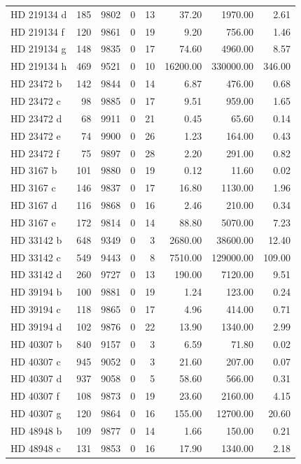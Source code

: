 \begin{table}
\begin{tabular}{lrrrrrrr}
HD 219134 d & 185 & 9802 & 0 & 13 & 37.20 & 1970.00 & 2.61 \\
HD 219134 f & 120 & 9861 & 0 & 19 & 9.20 & 756.00 & 1.46 \\
HD 219134 g & 148 & 9835 & 0 & 17 & 74.60 & 4960.00 & 8.57 \\
HD 219134 h & 469 & 9521 & 0 & 10 & 16200.00 & 330000.00 & 346.00 \\
HD 23472 b & 142 & 9844 & 0 & 14 & 6.87 & 476.00 & 0.68 \\
HD 23472 c & 98 & 9885 & 0 & 17 & 9.51 & 959.00 & 1.65 \\
HD 23472 d & 68 & 9911 & 0 & 21 & 0.45 & 65.60 & 0.14 \\
HD 23472 e & 74 & 9900 & 0 & 26 & 1.23 & 164.00 & 0.43 \\
HD 23472 f & 75 & 9897 & 0 & 28 & 2.20 & 291.00 & 0.82 \\
HD 3167 b & 101 & 9880 & 0 & 19 & 0.12 & 11.60 & 0.02 \\
HD 3167 c & 146 & 9837 & 0 & 17 & 16.80 & 1130.00 & 1.96 \\
HD 3167 d & 116 & 9868 & 0 & 16 & 2.46 & 210.00 & 0.34 \\
HD 3167 e & 172 & 9814 & 0 & 14 & 88.80 & 5070.00 & 7.23 \\
HD 33142 b & 648 & 9349 & 0 & 3 & 2680.00 & 38600.00 & 12.40 \\
HD 33142 c & 549 & 9443 & 0 & 8 & 7510.00 & 129000.00 & 109.00 \\
HD 33142 d & 260 & 9727 & 0 & 13 & 190.00 & 7120.00 & 9.51 \\
HD 39194 b & 100 & 9881 & 0 & 19 & 1.24 & 123.00 & 0.24 \\
HD 39194 c & 118 & 9865 & 0 & 17 & 4.96 & 414.00 & 0.71 \\
HD 39194 d & 102 & 9876 & 0 & 22 & 13.90 & 1340.00 & 2.99 \\
HD 40307 b & 840 & 9157 & 0 & 3 & 6.59 & 71.80 & 0.02 \\
HD 40307 c & 945 & 9052 & 0 & 3 & 21.60 & 207.00 & 0.07 \\
HD 40307 d & 937 & 9058 & 0 & 5 & 58.60 & 566.00 & 0.31 \\
HD 40307 f & 108 & 9873 & 0 & 19 & 23.60 & 2160.00 & 4.15 \\
HD 40307 g & 120 & 9864 & 0 & 16 & 155.00 & 12700.00 & 20.60 \\
HD 48948 b & 109 & 9877 & 0 & 14 & 1.66 & 150.00 & 0.21 \\
HD 48948 c & 131 & 9853 & 0 & 16 & 17.90 & 1340.00 & 2.18 \\

\end{tabular}
\end{table}
